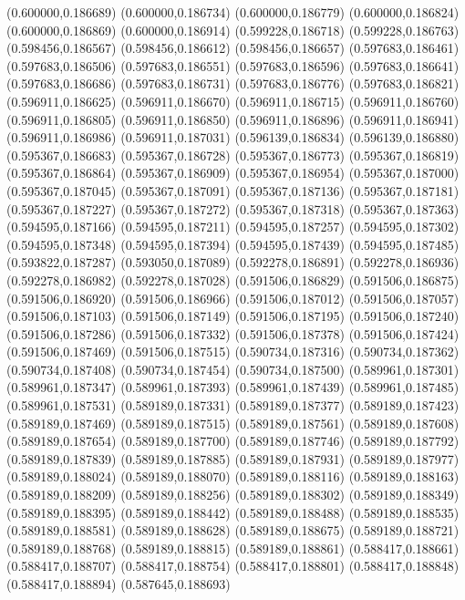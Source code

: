 (0.600000,0.186689)
(0.600000,0.186734)
(0.600000,0.186779)
(0.600000,0.186824)
(0.600000,0.186869)
(0.600000,0.186914)
(0.599228,0.186718)
(0.599228,0.186763)
(0.598456,0.186567)
(0.598456,0.186612)
(0.598456,0.186657)
(0.597683,0.186461)
(0.597683,0.186506)
(0.597683,0.186551)
(0.597683,0.186596)
(0.597683,0.186641)
(0.597683,0.186686)
(0.597683,0.186731)
(0.597683,0.186776)
(0.597683,0.186821)
(0.596911,0.186625)
(0.596911,0.186670)
(0.596911,0.186715)
(0.596911,0.186760)
(0.596911,0.186805)
(0.596911,0.186850)
(0.596911,0.186896)
(0.596911,0.186941)
(0.596911,0.186986)
(0.596911,0.187031)
(0.596139,0.186834)
(0.596139,0.186880)
(0.595367,0.186683)
(0.595367,0.186728)
(0.595367,0.186773)
(0.595367,0.186819)
(0.595367,0.186864)
(0.595367,0.186909)
(0.595367,0.186954)
(0.595367,0.187000)
(0.595367,0.187045)
(0.595367,0.187091)
(0.595367,0.187136)
(0.595367,0.187181)
(0.595367,0.187227)
(0.595367,0.187272)
(0.595367,0.187318)
(0.595367,0.187363)
(0.594595,0.187166)
(0.594595,0.187211)
(0.594595,0.187257)
(0.594595,0.187302)
(0.594595,0.187348)
(0.594595,0.187394)
(0.594595,0.187439)
(0.594595,0.187485)
(0.593822,0.187287)
(0.593050,0.187089)
(0.592278,0.186891)
(0.592278,0.186936)
(0.592278,0.186982)
(0.592278,0.187028)
(0.591506,0.186829)
(0.591506,0.186875)
(0.591506,0.186920)
(0.591506,0.186966)
(0.591506,0.187012)
(0.591506,0.187057)
(0.591506,0.187103)
(0.591506,0.187149)
(0.591506,0.187195)
(0.591506,0.187240)
(0.591506,0.187286)
(0.591506,0.187332)
(0.591506,0.187378)
(0.591506,0.187424)
(0.591506,0.187469)
(0.591506,0.187515)
(0.590734,0.187316)
(0.590734,0.187362)
(0.590734,0.187408)
(0.590734,0.187454)
(0.590734,0.187500)
(0.589961,0.187301)
(0.589961,0.187347)
(0.589961,0.187393)
(0.589961,0.187439)
(0.589961,0.187485)
(0.589961,0.187531)
(0.589189,0.187331)
(0.589189,0.187377)
(0.589189,0.187423)
(0.589189,0.187469)
(0.589189,0.187515)
(0.589189,0.187561)
(0.589189,0.187608)
(0.589189,0.187654)
(0.589189,0.187700)
(0.589189,0.187746)
(0.589189,0.187792)
(0.589189,0.187839)
(0.589189,0.187885)
(0.589189,0.187931)
(0.589189,0.187977)
(0.589189,0.188024)
(0.589189,0.188070)
(0.589189,0.188116)
(0.589189,0.188163)
(0.589189,0.188209)
(0.589189,0.188256)
(0.589189,0.188302)
(0.589189,0.188349)
(0.589189,0.188395)
(0.589189,0.188442)
(0.589189,0.188488)
(0.589189,0.188535)
(0.589189,0.188581)
(0.589189,0.188628)
(0.589189,0.188675)
(0.589189,0.188721)
(0.589189,0.188768)
(0.589189,0.188815)
(0.589189,0.188861)
(0.588417,0.188661)
(0.588417,0.188707)
(0.588417,0.188754)
(0.588417,0.188801)
(0.588417,0.188848)
(0.588417,0.188894)
(0.587645,0.188693)
